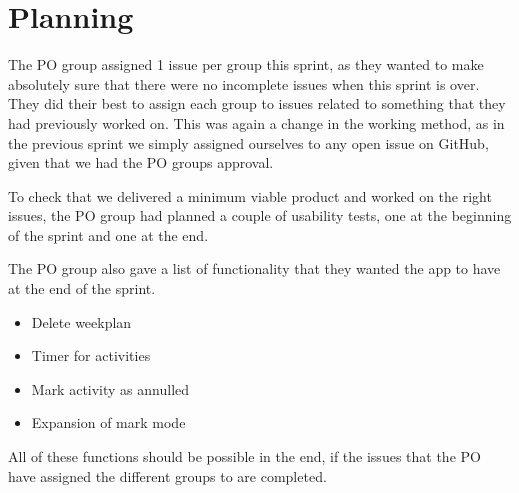 \section{Planning}
The PO group assigned 1 issue per group this sprint, as they wanted to make absolutely sure that there were no incomplete issues when this sprint is over. 
They did their best to assign each group to issues related to something that they had previously worked on.
This was again a change in the working method, as in the previous sprint we simply assigned ourselves to any open issue on GitHub, given that we had the PO groups approval.

To check that we delivered a minimum viable product and worked on the right issues, the PO group had planned a couple of usability tests, one at the beginning of the sprint and one at the end.

The PO group also gave a list of functionality that they wanted the app to have at the end of the sprint.

\begin{itemize}
  \item Delete weekplan
  \item Timer for activities
  \item Mark activity as annulled
  \item Expansion of mark mode
\end{itemize}

All of these functions should be possible in the end, if the issues that the PO have assigned the different groups to are completed.
